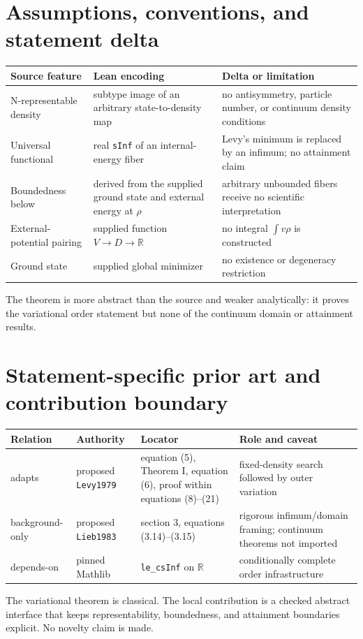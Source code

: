 \section{Assumptions, conventions, and statement delta}
\begin{tabularx}{\textwidth}{@{}YYY@{}}
\toprule
Source feature & Lean encoding & Delta or limitation \\
\midrule
N-representable density & subtype image of an arbitrary state-to-density map & no antisymmetry, particle number, or continuum density conditions \\
Universal functional & real \texttt{sInf} of an internal-energy fiber & Levy's minimum is replaced by an infimum; no attainment claim \\
Boundedness below & derived from the supplied ground state and external energy at \(\rho\) & arbitrary unbounded fibers receive no scientific interpretation \\
External-potential pairing & supplied function \(V\to D\to\mathbb R\) & no integral \(\int v\rho\) is constructed \\
Ground state & supplied global minimizer & no existence or degeneracy restriction \\
\bottomrule
\end{tabularx}
The theorem is more abstract than the source and weaker analytically: it proves the variational
order statement but none of the continuum domain or attainment results.

\section{Statement-specific prior art and contribution boundary}
\begin{tabularx}{\textwidth}{@{}lYYY@{}}
\toprule
Relation & Authority & Locator & Role and caveat \\
\midrule
adapts & proposed \texttt{Levy1979} & equation (5), Theorem I, equation (6), proof within equations (8)--(21) & fixed-density search followed by outer variation \\
background-only & proposed \texttt{Lieb1983} & section 3, equations (3.14)--(3.15) & rigorous infimum/domain framing; continuum theorems not imported \\
depends-on & pinned Mathlib & \texttt{le\_csInf} on \(\mathbb R\) & conditionally complete order infrastructure \\
\bottomrule
\end{tabularx}
The variational theorem is classical.  The local contribution is a checked abstract interface that
keeps representability, boundedness, and attainment boundaries explicit.  No novelty claim is made.

